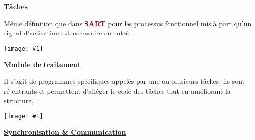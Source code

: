 \documentclass{article}
\newcommand{\dred}[1]{\textcolor{darkred}{\textbf{#1}}}
\newcommand{\imgR}[2]{\begin{center}\texttt{[image: \#1]}\end{center}}
\newcommand{\stitre}[1]{\noindent\textbf{\underline{#1}} \\}
\begin{document}
\stitre{Tâches}

\begin{multicols}{2}
Même définition que dans \dred{SART} pour les processus fonctionnel mis à part qu'un signal d'activation est 
nécessaire en entrée.
\imgR{img/ITR_013.png}{150}
\end{multicols}

\stitre{Module de traitement}

\begin{multicols}{2}
Il s'agit de programmes spécifiques appelés par une ou plusieurs tâches, ils sont ré-entrants et permettent 
d'alléger le code des tâches tout en améliorant la structure.
\imgR{img/ITR_014.png}{150}
\end{multicols}

\stitre{Synchronisation \& Communication}
\end{document}
